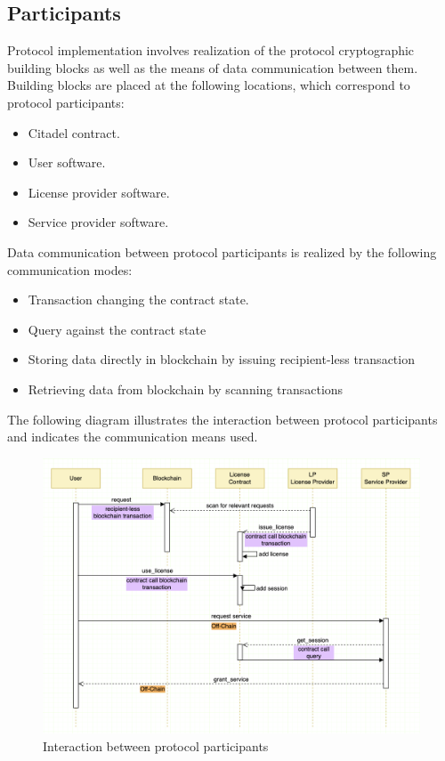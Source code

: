 
\subsection{Participants} 
Protocol implementation involves realization of the protocol cryptographic building blocks as well as the means of data communication between them. Building blocks are placed at the following locations, which correspond to protocol participants:

\begin{itemize}%
	\item Citadel contract.
	\item User software.
	\item License provider software.
	\item Service provider software.
\end{itemize}

Data communication between protocol participants is realized by the following communication modes:

\begin{itemize}%
	\item Transaction changing the contract state.
	\item Query against the contract state
	\item Storing data directly in blockchain by issuing recipient-less transaction
	\item Retrieving data from blockchain by scanning transactions
\end{itemize}

The following diagram illustrates the interaction between protocol participants and indicates the communication means used.

\begin{figure}[h]
	\centering
		\includegraphics[width=390pt,draft=false]{images/implementation.png}
	\caption{Interaction between protocol participants}
	\label{fig:implementation}
\end{figure}


